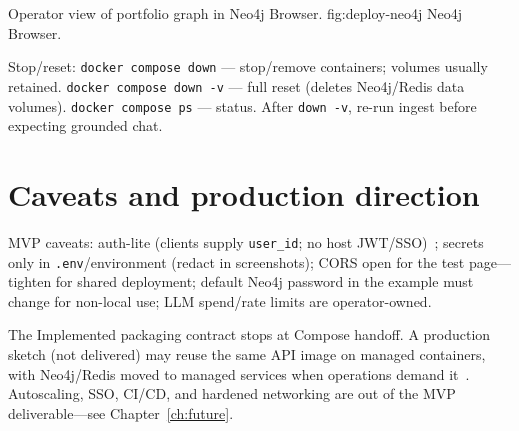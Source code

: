 %
{Operator view of portfolio graph in Neo4j Browser.}%
{fig:deploy-neo4j}%
{Neo4j Browser.}

\noindent
Stop/reset: \texttt{docker compose down} --- stop/remove containers; volumes usually retained. \texttt{docker compose down -v} --- full reset (deletes Neo4j/Redis data volumes). \texttt{docker compose ps} --- status. After \texttt{down -v}, re-run ingest before expecting grounded chat.

\section{Caveats and production direction}

MVP caveats: auth-lite (clients supply \texttt{user\_id}; no host JWT/SSO)~\cite{prd,trd}; secrets only in \texttt{.env}/environment (redact in screenshots); CORS open for the test page---tighten for shared deployment; default Neo4j password in the example must change for non-local use; LLM spend/rate limits are operator-owned.

\label{sec:prod-future}
The Implemented packaging contract stops at Compose handoff. A production sketch (not delivered) may reuse the same API image on managed containers, with Neo4j/Redis moved to managed services when operations demand it~\cite{trd}. Autoscaling, SSO, CI/CD, and hardened networking are out of the MVP deliverable---see Chapter~\ref{ch:future}.
